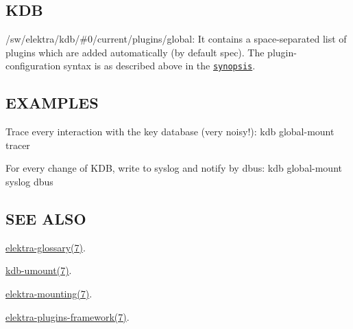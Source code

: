 \subsection*{K\+D\+B}


\begin{DoxyItemize}
\item {\ttfamily /sw/elektra/kdb/\#0/current/plugins/global}\+: It contains a space-\/separated list of plugins which are added automatically (by default {\ttfamily spec}). The plugin-\/configuration syntax is as described above in the \href{#SYNOPSIS}{\tt synopsis}.
\end{DoxyItemize}

\subsection*{E\+X\+A\+M\+P\+L\+E\+S}

Trace every interaction with the key database (very noisy!)\+: {\ttfamily kdb global-\/mount tracer}

For every change of K\+D\+B, write to syslog and notify by dbus\+: {\ttfamily kdb global-\/mount syslog dbus}

\subsection*{S\+E\+E A\+L\+S\+O}


\begin{DoxyItemize}
\item \hyperlink{md_doc_help_elektra-glossary_doc_help_elektra-glossary_md}{elektra-\/glossary(7)}.
\item \hyperlink{md_doc_help_kdb-umount_doc_help_kdb-umount_md}{kdb-\/umount(7)}.
\item \hyperlink{md_doc_help_elektra-mounting_doc_help_elektra-mounting_md}{elektra-\/mounting(7)}.
\item \hyperlink{md_doc_help_elektra-plugins-framework_doc_help_elektra-plugins-framework_md}{elektra-\/plugins-\/framework(7)}. 
\end{DoxyItemize}